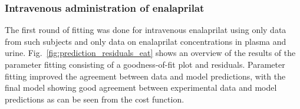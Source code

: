 \subsubsection{Intravenous administration of enalaprilat}


The first round of fitting was done for intravenous enalaprilat using only data from such subjects and only data on enalaprilat concentrations in plasma and urine. Fig.~\ref{fig:prediction_residuals_eat} shows an overview of the results of the parameter fitting consisting of a goodness-of-fit plot and residuals. Parameter fitting improved the agreement between data and model predictions, with the final model showing good agreement between experimental data and model predictions as can be seen from the cost function.


